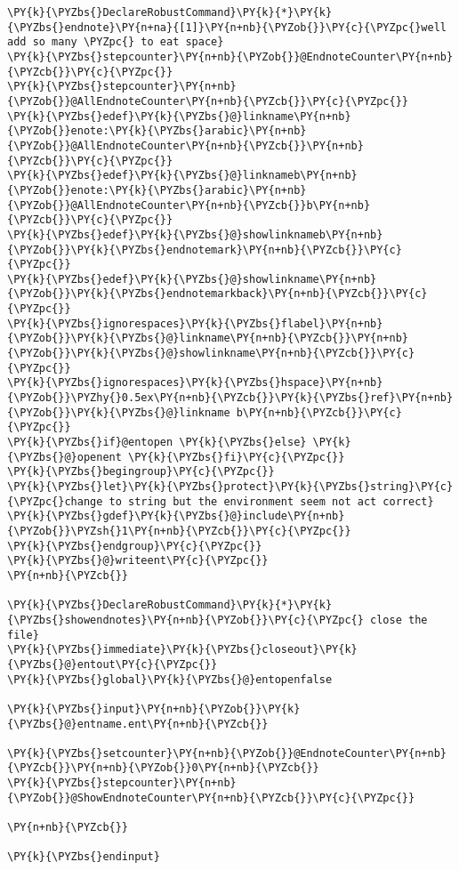 \begin{Verbatim}[commandchars=\\\{\}]
\PY{k}{\PYZbs{}DeclareRobustCommand}\PY{k}{*}\PY{k}{\PYZbs{}endnote}\PY{n+na}{[1]}\PY{n+nb}{\PYZob{}}\PY{c}{\PYZpc{}well add so many \PYZpc{} to eat space}
\PY{k}{\PYZbs{}stepcounter}\PY{n+nb}{\PYZob{}}@EndnoteCounter\PY{n+nb}{\PYZcb{}}\PY{c}{\PYZpc{}}
\PY{k}{\PYZbs{}stepcounter}\PY{n+nb}{\PYZob{}}@AllEndnoteCounter\PY{n+nb}{\PYZcb{}}\PY{c}{\PYZpc{}}
\PY{k}{\PYZbs{}edef}\PY{k}{\PYZbs{}@}linkname\PY{n+nb}{\PYZob{}}enote:\PY{k}{\PYZbs{}arabic}\PY{n+nb}{\PYZob{}}@AllEndnoteCounter\PY{n+nb}{\PYZcb{}}\PY{n+nb}{\PYZcb{}}\PY{c}{\PYZpc{}}
\PY{k}{\PYZbs{}edef}\PY{k}{\PYZbs{}@}linknameb\PY{n+nb}{\PYZob{}}enote:\PY{k}{\PYZbs{}arabic}\PY{n+nb}{\PYZob{}}@AllEndnoteCounter\PY{n+nb}{\PYZcb{}}b\PY{n+nb}{\PYZcb{}}\PY{c}{\PYZpc{}}
\PY{k}{\PYZbs{}edef}\PY{k}{\PYZbs{}@}showlinknameb\PY{n+nb}{\PYZob{}}\PY{k}{\PYZbs{}endnotemark}\PY{n+nb}{\PYZcb{}}\PY{c}{\PYZpc{}}
\PY{k}{\PYZbs{}edef}\PY{k}{\PYZbs{}@}showlinkname\PY{n+nb}{\PYZob{}}\PY{k}{\PYZbs{}endnotemarkback}\PY{n+nb}{\PYZcb{}}\PY{c}{\PYZpc{}}
\PY{k}{\PYZbs{}ignorespaces}\PY{k}{\PYZbs{}flabel}\PY{n+nb}{\PYZob{}}\PY{k}{\PYZbs{}@}linkname\PY{n+nb}{\PYZcb{}}\PY{n+nb}{\PYZob{}}\PY{k}{\PYZbs{}@}showlinkname\PY{n+nb}{\PYZcb{}}\PY{c}{\PYZpc{}}
\PY{k}{\PYZbs{}ignorespaces}\PY{k}{\PYZbs{}hspace}\PY{n+nb}{\PYZob{}}\PYZhy{}0.5ex\PY{n+nb}{\PYZcb{}}\PY{k}{\PYZbs{}ref}\PY{n+nb}{\PYZob{}}\PY{k}{\PYZbs{}@}linkname b\PY{n+nb}{\PYZcb{}}\PY{c}{\PYZpc{}}
\PY{k}{\PYZbs{}if}@entopen \PY{k}{\PYZbs{}else} \PY{k}{\PYZbs{}@}openent \PY{k}{\PYZbs{}fi}\PY{c}{\PYZpc{}}
\PY{k}{\PYZbs{}begingroup}\PY{c}{\PYZpc{}}
\PY{k}{\PYZbs{}let}\PY{k}{\PYZbs{}protect}\PY{k}{\PYZbs{}string}\PY{c}{\PYZpc{}change to string but the environment seem not act correct}
\PY{k}{\PYZbs{}gdef}\PY{k}{\PYZbs{}@}include\PY{n+nb}{\PYZob{}}\PYZsh{}1\PY{n+nb}{\PYZcb{}}\PY{c}{\PYZpc{}}
\PY{k}{\PYZbs{}endgroup}\PY{c}{\PYZpc{}}
\PY{k}{\PYZbs{}@}writeent\PY{c}{\PYZpc{}}
\PY{n+nb}{\PYZcb{}}

\PY{k}{\PYZbs{}DeclareRobustCommand}\PY{k}{*}\PY{k}{\PYZbs{}showendnotes}\PY{n+nb}{\PYZob{}}\PY{c}{\PYZpc{} close the file}
\PY{k}{\PYZbs{}immediate}\PY{k}{\PYZbs{}closeout}\PY{k}{\PYZbs{}@}entout\PY{c}{\PYZpc{}}
\PY{k}{\PYZbs{}global}\PY{k}{\PYZbs{}@}entopenfalse

\PY{k}{\PYZbs{}input}\PY{n+nb}{\PYZob{}}\PY{k}{\PYZbs{}@}entname.ent\PY{n+nb}{\PYZcb{}}

\PY{k}{\PYZbs{}setcounter}\PY{n+nb}{\PYZob{}}@EndnoteCounter\PY{n+nb}{\PYZcb{}}\PY{n+nb}{\PYZob{}}0\PY{n+nb}{\PYZcb{}}
\PY{k}{\PYZbs{}stepcounter}\PY{n+nb}{\PYZob{}}@ShowEndnoteCounter\PY{n+nb}{\PYZcb{}}\PY{c}{\PYZpc{}}

\PY{n+nb}{\PYZcb{}}

\PY{k}{\PYZbs{}endinput}
\end{Verbatim}
